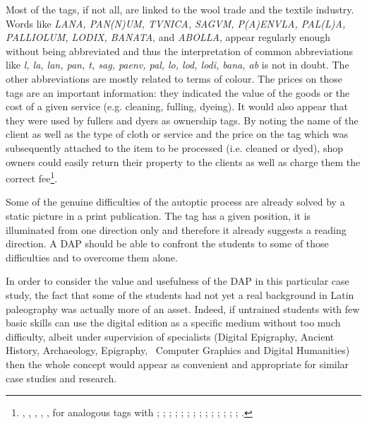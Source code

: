 \documentclass[amsthm,ebook]{saparticle}
\begin{document}
\begin{figure}
\centering

\end{figure}
Most of the tags, if not all, are linked to the wool trade and the textile industry. Words like \emph{LANA, PAN(N)UM, TVNICA, SAGVM, P(A)ENVLA, PAL(L)A, PALLIOLUM, LODIX, BANATA}, and \emph{ABOLLA}, appear regularly enough without being abbreviated and
thus the interpretation of common abbreviations like \emph{l, la, lan, pan, t, sag, paenv, pal, lo, lod, lodi, bana, ab} is
not in doubt. The other abbreviations are mostly related to terms of colour. The prices on those tags are an important
information: they indicated the value of the goods or the cost of a given service (e.g. cleaning, fulling, dyeing). It
would also appear that they were used by fullers and dyers as ownership tags. By noting the name of the client as well
as the type of cloth or service and the price on the tag which was subsequently attached to the item to be processed
(i.e. cleaned or dyed), shop owners could easily return their property to the clients as well as charge them the
correct fee\footnote{\citet{radman_livaja_segestica_2008}, \citet{radman-livaja_roetiquettes_2010}, \citet{radman-livaja_5_2013}, \citet[165-172]{radman-livaja_two_2013}, \citet{radman-livaja_plombs_2014},  for analogous tags with \citet[97-104]{mocsy_olom_1956}; \citet[195-210]{egger_funf_1968}; \citet[127-138]{frei-stolba_les_2011}; \citet[121-137/93, 215-222]{schwinden_romerzeitliche_1985}; \citet{romer-martijnse_romerzeitliche_1990}; \citet[5-48]{romer-martijnse_fruhkaiserzeitliche_1997}; \citet[301-305]{feugere_etiquette_1993}; \citet[211-220]{weiss_bleietiketten_1991}; \citet[29-40]{paci_etichette_1995}; \citet[207-216]{bassi_tre_1996}; \citet[121-135]{bizzarini_quattro_2005}; \citet[43-51]{buchi_etichette_2005}; \citet[42-110]{cresci_supellex_2010}; \citet[295-317]{jacques_artisanat_2010}; \citet[237-246]{wedenig_bleietikett_2013}.}. 

Some of the genuine difficulties of the autoptic process are already solved by a static picture in a print publication.
The tag has a given position, it is illuminated from one direction only and therefore it already suggests a reading
direction. A DAP should be able to confront the students to some of those difficulties and to overcome them alone.

In order to consider the value and usefulness of the DAP in this particular case study, the fact that some of the
students had not yet a real background in Latin paleography was actually more of an asset. Indeed, if untrained
students with few basic skills can use the digital edition as a specific medium without too much difficulty, albeit
under supervision of specialists (Digital Epigraphy, Ancient History, Archaeology, Epigraphy, \ Computer Graphics and
Digital Humanities) then the whole concept would appear as convenient and appropriate for similar case studies and
research. 
\end{document}
